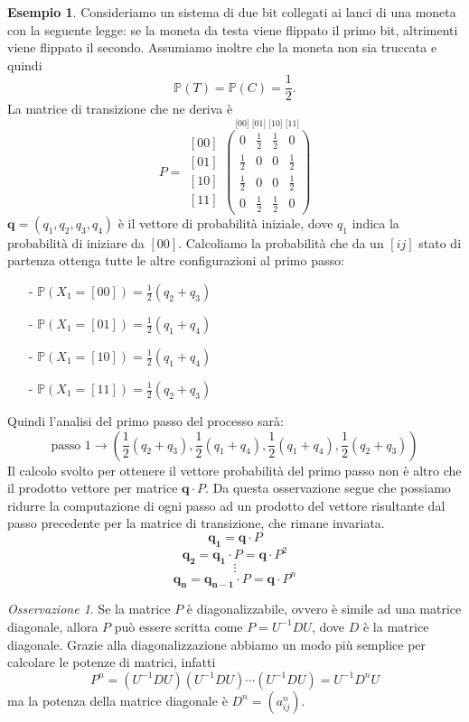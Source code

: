 \documentclass{article}
\theoremstyle{definition}
\newtheorem{example}[theorem]{Esempio}
\theoremstyle{remark}
\newtheorem{remark}[theorem]{Osservazione}
\begin{document}
\begin{example}
Consideriamo un sistema di due bit collegati ai lanci di una moneta con la seguente legge:
se la moneta da testa viene flippato il primo bit, altrimenti viene flippato il secondo. Assumiamo 
inoltre che la moneta non sia truccata e quindi
$$\mathbb{P}(T)= \mathbb{P}(C) = \frac{1}{2}.$$
La matrice di transizione che ne deriva è
$$P = \begin{matrix}
    [00]\\
    [01]\\
    [10]\\
    [11]
    \end{matrix}\overset{\text{[00] [01] [10] [11]}} 
    {\begin{pmatrix}
    0 &\frac{1}{2}&\frac{1}{2}&0\\
    \frac{1}{2}&0&0&\frac{1}{2}\\
    \frac{1}{2}&0&0&\frac{1}{2}\\
    0 &\frac{1}{2}&\frac{1}{2}&0
\end{pmatrix}}$$
$\boldsymbol{q}=(q_1,q_2,q_3,q_4)$ è il vettore di probabilità iniziale, dove $q_1$ indica la probabilità di iniziare da $[00]$.
Calcoliamo la probabilità che da un $[ij]$ stato di partenza ottenga tutte le altre configurazioni al primo passo:
\begin{itemize}
    \item [-]$\mathbb{P}(X_1=[00]) = \frac{1}{2}(q_2+q_3)$
    \item [-]$\mathbb{P}(X_1=[01]) = \frac{1}{2}(q_1+q_4)$
    \item [-]$\mathbb{P}(X_1=[10]) = \frac{1}{2}(q_1+q_4)$
    \item [-]$\mathbb{P}(X_1=[11]) = \frac{1}{2}(q_2+q_3)$
\end{itemize}
Quindi l'analisi del primo passo del processo sarà:
$$\text{passo 1} \to(\frac{1}{2}(q_2+q_3),\frac{1}{2}(q_1+q_4),\frac{1}{2}(q_1+q_4),\frac{1}{2}(q_2+q_3))$$
Il calcolo svolto per ottenere il vettore probabilità del primo passo non è altro che il prodotto vettore per matrice
$\boldsymbol{q} \cdot P$. Da questa osservazione segue che possiamo ridurre la computazione di ogni passo ad un prodotto del vettore 
risultante dal passo precedente per la matrice di transizione, che rimane invariata.
$$\boldsymbol{q_1} = \boldsymbol{q}\cdot P$$
$$\boldsymbol{q_2} =\boldsymbol{q_1}\cdot P= \boldsymbol{q}\cdot P^2$$
$$\vdots$$
$$\boldsymbol{q_n} = \boldsymbol{q_{n-1}}\cdot P = \boldsymbol{q}\cdot P^n$$
\end{example}
\begin{remark}
    Se la matrice $P$ è diagonalizzabile, ovvero è simile ad una matrice diagonale, allora $P$ può essere
    scritta come $P=U^{-1}DU$, dove $D$ è la matrice diagonale. Grazie alla diagonalizzazione abbiamo un modo
    più semplice per calcolare le potenze di matrici, infatti
    $$P^n = (U^{-1}DU)(U^{-1}DU)\dotsb (U^{-1}DU) = U^{-1}D^nU$$
    ma la potenza della matrice diagonale è $D^n = (a_{ij}^n)$.
\end{remark}
\end{document}
